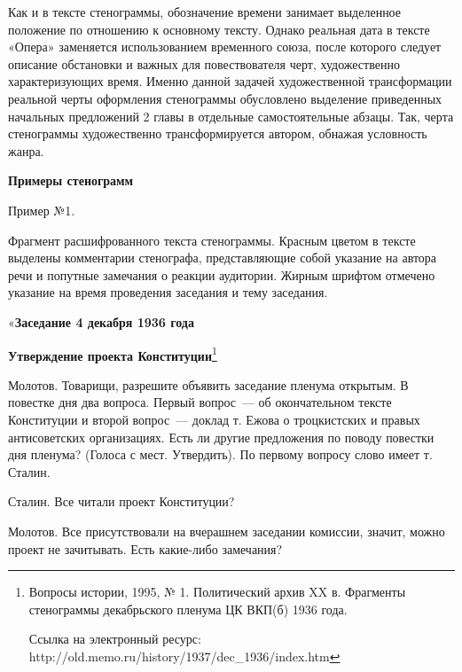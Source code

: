 \documentclass{kursa4}
\begin{document}
    {\color[rgb]{0.2,0.2,0.2}
    Как и в тексте стенограммы, обозначение времени занимает выделенное
    положение по отношению к основному тексту. Однако реальная дата в
    тексте «Опера» заменяется использованием временного союза, после
    которого следует описание обстановки и важных для повествователя черт,
    художественно характеризующих время. Именно данной задачей
    художественной трансформации реальной черты оформления стенограммы
    обусловлено выделение приведенных начальных предложений 2 главы в
    отдельные самостоятельные абзацы. Так, черта стенограммы художественно
    трансформируется автором, обнажая условность жанра. }


  {\bfseries
  \hypertarget{vt49pj7hzs12}{}Примеры стенограмм  }

  Пример №1. 

  Фрагмент расшифрованного текста стенограммы. Красным цветом в тексте
  выделены комментарии стенографа, представляющие собой указание на
  автора речи и попутные замечания о реакции аудитории. Жирным шрифтом
  отмечено указание на время проведения заседания и тему заседания.


  \bigskip


  \bigskip

  «\textbf{{Заседание 4 декабря 1936 года}}

  \textbf{{Утверждение проекта Конституции}}\footnote{
  Вопросы истории, 1995, № 1. Политический архив XX в. Фрагменты
  стенограммы декабрьского пленума ЦК ВКП(б) 1936 года.\par Ссылка на
  электронный ресурс:
  http://old.memo.ru/history/1937/dec\_1936/index.htm}

  \textcolor[rgb]{0.70980394,0.1764706,0.13725491}{Молотов.}{
  Товарищи, разрешите объявить заседание пленума открытым. В повестке дня
  два вопроса. Первый вопрос~--- об окончательном тексте Конституции и
  второй вопрос~--- доклад т. Ежова о троцкистских и правых антисоветских
  организациях. Есть ли другие предложения по поводу повестки дня
  пленума? (}\textcolor[rgb]{0.70980394,0.1764706,0.13725491}{Голоса с
  мест.}{ Утвердить). По первому вопросу слово имеет т.
  Сталин.}

  \textcolor[rgb]{0.70980394,0.1764706,0.13725491}{Сталин.}{
  Все читали проект Конституции?}

  \textcolor[rgb]{0.70980394,0.1764706,0.13725491}{Молотов.}{
  Все присутствовали на вчерашнем заседании комиссии, значит, можно
  проект не зачитывать. Есть какие-либо замечания?}
\end{document}
